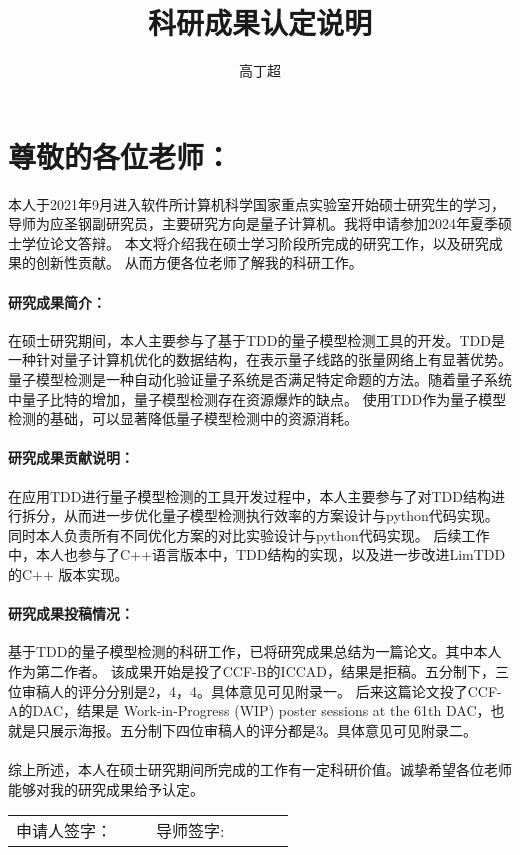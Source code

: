 \documentclass[10.5pt]{article} %
\title{科研成果认定说明} %
\author{高丁超} %
\date{} %
\begin{document}
\maketitle %
\thispagestyle{empty}
\section*{尊敬的各位老师：} %

本人于2021年9月进入软件所计算机科学国家重点实验室开始硕士研究生的学习，导师为应圣钢副研究员，主要研究方向是量子计算机。我将申请参加2024年夏季硕士学位论文答辩。
本文将介绍我在硕士学习阶段所完成的研究工作，以及研究成果的创新性贡献。
从而方便各位老师了解我的科研工作。


\paragraph*{研究成果简介：} %
在硕士研究期间，本人主要参与了基于TDD的量子模型检测工具的开发。TDD是一种针对量子计算机优化的数据结构，在表示量子线路的张量网络上有显著优势。
量子模型检测是一种自动化验证量子系统是否满足特定命题的方法。随着量子系统中量子比特的增加，量子模型检测存在资源爆炸的缺点。
使用TDD作为量子模型检测的基础，可以显著降低量子模型检测中的资源消耗。

\paragraph*{研究成果贡献说明：}在应用TDD进行量子模型检测的工具开发过程中，本人主要参与了对TDD结构进行拆分，从而进一步优化量子模型检测执行效率的方案设计与python代码实现。
同时本人负责所有不同优化方案的对比实验设计与python代码实现。
后续工作中，本人也参与了C++语言版本中，TDD结构的实现，以及进一步改进LimTDD的C++ 版本实现。

\paragraph*{研究成果投稿情况：}
基于TDD的量子模型检测的科研工作，已将研究成果总结为一篇论文。其中本人作为第二作者。
该成果开始是投了CCF-B的ICCAD，结果是拒稿。五分制下，三位审稿人的评分分别是2，4，4。具体意见可见附录一。
后来这篇论文投了CCF-A的DAC，结果是 Work-in-Progress (WIP) poster sessions at the 61th DAC，也就是只展示海报。五分制下四位审稿人的评分都是3。具体意见可见附录二。

\paragraph*{}
\setlength{\parindent}{0pt}
综上所述，本人在硕士研究期间所完成的工作有一定科研价值。诚挚希望各位老师能够对我的研究成果给予认定。\\[0.5cm]
\begin{tabular}{p{0.4\linewidth} p{0.4\linewidth}}
    申请人签字： & \centering 导师签字: \\
\end{tabular}
\end{document}
